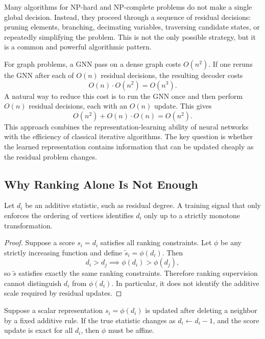 Many algorithms for NP-hard and NP-complete problems do not make a single global decision. Instead, they proceed through a sequence of residual decisions: pruning elements, branching, decimating variables, traversing candidate states, or repeatedly simplifying the problem. This is not the only possible strategy, but it is a common and powerful algorithmic pattern.

For graph problems, a GNN pass on a dense graph costs $O(n^2)$. If one reruns the GNN after each of $O(n)$ residual decisions, the resulting decoder costs
\[
  O(n)\cdot O(n^2) = O(n^3).
\]
A natural way to reduce this cost is to run the GNN once and then perform $O(n)$ residual decisions, each with an $O(n)$ update. This gives
\[
  O(n^2) + O(n)\cdot O(n) = O(n^2).
\]
This approach combines the representation-learning ability of neural networks with the efficiency of classical iterative algorithms. The key question is whether the learned representation contains information that can be updated cheaply as the residual problem changes.

\subsection{Why Ranking Alone Is Not Enough}

\begin{lemma}
  Let $d_i$ be an additive statistic, such as residual degree. A training signal that only enforces the ordering of vertices identifies $d_i$ only up to a strictly monotone transformation.
\end{lemma}

\begin{proof}
  Suppose a score $s_i=d_i$ satisfies all ranking constraints. Let $\phi$ be any strictly increasing function and define $\tilde{s}_i=\phi(d_i)$. Then
  \[
    d_i>d_j \implies \phi(d_i)>\phi(d_j),
  \]
  so $\tilde{s}$ satisfies exactly the same ranking constraints. Therefore ranking supervision cannot distinguish $d_i$ from $\phi(d_i)$. In particular, it does not identify the additive scale required by residual updates.
\end{proof}

\begin{theorem}
  Suppose a scalar representation $s_i=\phi(d_i)$ is updated after deleting a neighbor by a fixed additive rule. If the true statistic changes as $d_i\leftarrow d_i-1$, and the score update is exact for all $d_i$, then $\phi$ must be affine.
\end{theorem}

